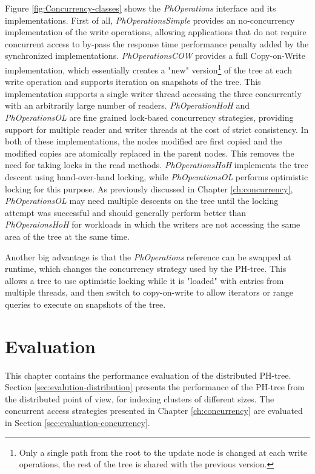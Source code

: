 \documentclass[11pt,a4paper]{globis-book}
\begin{document}
Figure \ref{fig:Concurrency-classes} shows the \textit{PhOperations} interface and its implementations. First of all, \textit{PhOperationsSimple} provides an no-concurrency implementation of the write operations, allowing applications that do not require concurrent access to by-pass the response time performance penalty added by the synchronized implementations. \textit{PhOperationsCOW} provides a full Copy-on-Write implementation, which essentially creates a "new" version\footnote{Only a single path from the root to the update node is changed at each write operations, the rest of the tree is shared with the previous version.} of the tree at each write operation and supports iteration on snapshots of the tree. This implementation supports a single writer thread accessing the three concurrently with an arbitrarily large number of readers. \textit{PhOperationHoH} and \textit{PhOperationsOL} are fine grained lock-based concurrency strategies, providing support for multiple reader and writer threads at the cost of strict consistency. In both of these implementations, the nodes modified are first copied and the modified copies are atomically replaced in the parent nodes. This removes the need for taking locks in the read methods. \textit{PhOperationsHoH} implements the tree descent using hand-over-hand locking, while \textit{PhOperationsOL} performs optimistic locking for this purpose. As previously discussed in Chapter \ref{ch:concurrency}, \textit{PhOperationsOL} may need multiple descents on the tree until the locking attempt was successful and should generally perform better than \textit{PhOperaionsHoH} for workloads in which the writers are not accessing the same area of the tree at the same time.

Another big advantage is that the \textit{PhOperations} reference can be swapped at runtime, which changes the concurrency strategy used by the PH-tree. This allows a tree to use optimistic locking while it is "loaded" with entries from multiple threads, and then switch to copy-on-write to allow iterators or range queries to execute on snapshots of the tree. 

\chapter{Evaluation}
\label{ch:evaluation}

This chapter contains the performance evaluation of the distributed PH-tree. Section \ref{sec:evalution-distribution} presents the performance of the PH-tree from the distributed point of view, for indexing clusters of different sizes. The concurrent access strategies presented in Chapter \ref{ch:concurrency} are evaluated in Section \ref{sec:evaluation-concurrency}.
\end{document}
